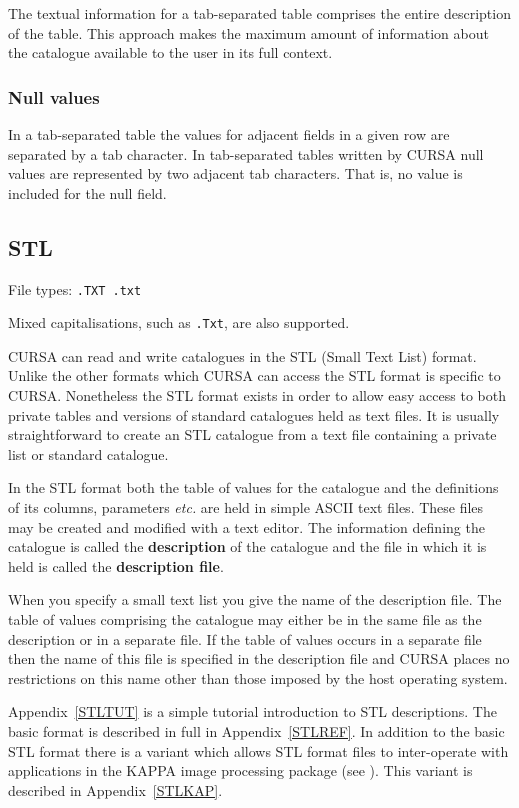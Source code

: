 \documentclass[twoside,11pt]{starlink}
\begin{document}
The textual information for a tab-separated table comprises the entire
description of the table.  This approach makes the maximum amount of
information about the catalogue available to the user in its full context.

\subsubsection{Null values}

In a tab-separated table the values for adjacent fields in a given row are
separated by a tab character.  In tab-separated tables written by CURSA
null values are represented by two adjacent tab characters.  That is, no
value is included for the null field.

\subsection{STL}

File types: \texttt{.TXT  .txt}

Mixed capitalisations, such as \texttt{.Txt}, are also supported.

CURSA can read and write catalogues in the STL (Small Text List) format.
Unlike the other formats which CURSA can access the STL format is specific
to CURSA.  Nonetheless the STL format exists in order to allow
easy access to both private tables and versions of standard catalogues
held as text files.  It is usually straightforward to create an STL
catalogue from a text file containing a private list or standard catalogue.

In the STL format both the table of values for the catalogue and the
definitions of its columns, parameters \emph{etc.} are held in simple ASCII
text files.  These files may be created and modified with a text editor.
The information defining the catalogue is called the \textbf{description} of
the catalogue and the file in which it is held is called the \textbf{description file}.

When you specify a small text list you give the name of the description
file.  The table of values comprising the catalogue may either be in the
same file as the description or in a separate file.  If the table of values
occurs in a separate file then the name of this file is specified in the
description file and CURSA places no restrictions on this name other than
those imposed by the host operating system.

Appendix~\ref{STLTUT} is a simple tutorial introduction to STL
descriptions.  The basic format is described in full in
Appendix~\ref{STLREF}.  In addition to the basic STL format there is a
variant which allows STL format files to inter-operate with applications
in the KAPPA image processing package (see
\cite{SUN95}).  This variant is described in
Appendix~\ref{STLKAP}.
\end{document}
